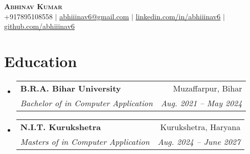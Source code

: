\documentclass[letterpaper,11pt]{article}
\makeatletter
\newcommand{\resumeItem}[1]{
  \item\small{
    {#1 \vspace{-2pt}}
  }
}
\newcommand{\resumeSubheading}[4]{
  \vspace{-2pt}\item
    \begin{tabular*}{0.97\textwidth}[t]{l@{\extracolsep{\fill}}r}
      \textbf{#1} & #2 \\
      \textit{\small#3} & \textit{\small #4} \\
    \end{tabular*}\vspace{-7pt}
}
\newcommand{\resumeSubSubheading}[2]{
    \item
    \begin{tabular*}{0.97\textwidth}{l@{\extracolsep{\fill}}r}
      \textit{\small#1} & \textit{\small #2} \\
    \end{tabular*}\vspace{-7pt}
}
\newcommand{\resumeSubHeadingListStart}{\begin{itemize}[leftmargin=0.15in, label={}]}
\newcommand{\resumeSubHeadingListEnd}{\end{itemize}}
\newcommand{\resumeItemListStart}{\begin{itemize}}
\newcommand{\resumeItemListEnd}{\end{itemize}\vspace{-5pt}}
\makeatother
\begin{document}

\begin{center}
    \textbf{\Huge \scshape Abhinav Kumar} \\ \vspace{1pt}
    \small +917895108558 $|$ \href{mailto:abhiiinav6@gmail.com}{\underline{abhiiinav6@gmail.com}} $|$ 
    \href{https://linkedin.com/in/abhiiinav6}{\underline{linkedin.com/in/abhiiinav6}} $|$
    \href{https://github.com/abhiiinav6}{\underline{github.com/abhiiinav6}}
\end{center}


\section{Education}
  \resumeSubHeadingListStart
    \resumeSubheading
      {B.R.A. Bihar University}{Muzaffarpur, Bihar}
      {Bachelor of in Computer Application}{Aug. 2021 -- May 2024}
    \resumeSubheading
      {N.I.T. Kurukshetra}{Kurukshetra, Haryana}
      {Masters of in Computer Application}{Aug. 2024 -- June 2027}
  \resumeSubHeadingListEnd



      
\end{document}
